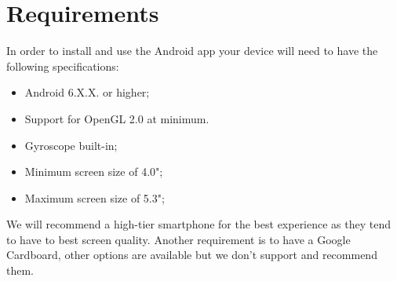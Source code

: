 \section{Requirements}
In order to install and use the Android app your device will need to have the following specifications:
\begin{itemize}
	\item Android 6.X.X. or higher;
	\item Support for OpenGL 2.0 at minimum.
	\item Gyroscope built-in;
	\item Minimum screen size of 4.0";
	\item Maximum screen size of 5.3";	
\end{itemize}

We will recommend a high-tier smartphone for the best experience as they tend to have to best screen quality. Another requirement is to have a Google Cardboard, other options are available but we don't support and recommend them.

